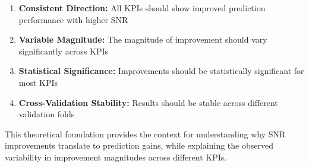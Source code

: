 \begin{enumerate}
    \item \textbf{Consistent Direction:} All KPIs should show improved prediction performance with higher SNR
    \item \textbf{Variable Magnitude:} The magnitude of improvement should vary significantly across KPIs
    \item \textbf{Statistical Significance:} Improvements should be statistically significant for most KPIs
    \item \textbf{Cross-Validation Stability:} Results should be stable across different validation folds
\end{enumerate}

This theoretical foundation provides the context for understanding why SNR improvements translate to prediction gains, while explaining the observed variability in improvement magnitudes across different KPIs.
